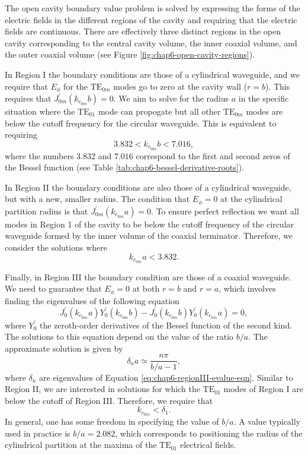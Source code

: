 The open cavity boundary value problem is solved by expressing the forms of the electric fields in the different regions of the cavity and requiring that the electric fields are continuous. There are effectively three distinct regions in the open cavity corresponding to the central cavity volume, the inner coaxial volume, and the outer coaxial volume (see Figure \ref{fig:chap6-open-cavity-regions}). 

In Region I the boundary conditions are those of a cylindrical waveguide, and we require that $E_\phi$ for the $\mathrm{TE}_{0m}$ modes go to zero at the cavity wall ($r=b$). This requires that $J^\prime_{0m}(k_{c_{0m}}b)=0$. We aim to solve for the radius $a$ in the specific situation where the $\mathrm{TE}_{01}$ mode can propogate but all other $\mathrm{TE}_{0m}$ modes are below the cutoff frequency for the circular waveguide. This is equivalent to requiring 
\begin{equation}
    3.832<k_{c_{0m}}b<7.016,
\end{equation}
where the numbers $3.832$ and $7.016$ correspond to the first and second zeros of the Bessel function (see Table \ref{tab:chap6-bessel-derivative-roots}).

In Region II the boundary conditions are also those of a cylindrical waveguide, but with a new, smaller radius. The condition that $E_\phi=0$ at the cylindrical partition radius is that $J^\prime_{0m}(k_{c_{0m}}a)=0$. To ensure perfect reflection we want all modes in Region 1 of the cavity to be below the cutoff frequency of the circular waveguide formed by the inner volume of the coaxial terminator. Therefore, we consider the solutions where
\begin{equation}
    k_{c_{0m}}a<3.832.
\end{equation}

Finally, in Region III the boundary condition are those of a coaxial waveguide. We need to guarantee that $E_\phi = 0$ at both $r=b$ and $r=a$, which involves finding the eigenvalues of the following equation
\begin{equation}
    J^\prime_{0}(k_{c_{0m}}a)Y^\prime_0(k_{c_{0m}}b)-J^\prime_0(k_{c_{0m}}b)Y^\prime_0(k_{c_{0m}}a) = 0,
    \label{eq:chap6-regionIII-evalue-eqn}
\end{equation}
where $Y_0^\prime$ the zeroth-order derivatives of the Bessel function of the second kind. The solutions to this equation depend on the value of the ratio $b/a$. The approximate solution is given by 
\begin{equation}
    \delta_na\simeq\frac{n\pi}{b/a-1},  
\end{equation}
where $\delta_n$ are eigenvalues of Equation \ref{eq:chap6-regionIII-evalue-eqn}. Similar to Region II, we are interested in solutions for which the $\mathrm{TE}_{01}$ modes of Region I are below the cutoff of Region III. Therefore, we require that 
\begin{equation}
    k_{c_{0m}}<\delta_1.
\end{equation}
In general, one has some freedom in specifying the value of $b/a$. A value typically used in practice is $b/a=2.082$, which corresponds to positioning the radius of the cylindrical partition at the maxima of the $\mathrm{TE}_{01}$ electrical fields. 

